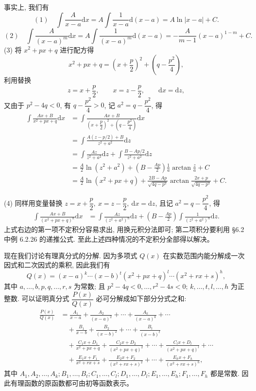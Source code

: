 \documentclass[UTF8, 12pt, fontset=fandol, oneside]{ctexart}
\begin{document}
事实上, 我们有
\[
  (1)\quad
  \int\frac A{x-a}\mathrm dx
  =
  A\int\frac1{x-a}\mathrm d(x-a)
  =
  A\ln|x-a|+C.
\]
\[
  (2)\quad
  \int\frac A{(x-a)^m}\mathrm dx
  =
  A\int\frac1{(x-a)^m}\mathrm d(x-a)
  =
  -\frac A{m-1}(x-a)^{1-m}+C.
\]
(3) 将 $x^2+px+q$ 进行配方得
\[
  x^2+px+q=\left(x+\frac p2\right)^2+\left(q-\frac{p^2}4\right),
\]
利用替换
\[
  z=x+\frac p2,\qquad x=z-\frac p2,\qquad \mathrm dx=\mathrm dz,
\]
又由于 $p^2-4q<0$, 有 $q-\dfrac{p^2}4>0$, 记 $a^2=q-\dfrac{p^2}4$, 得
\[
\begin{aligned}
  \int\frac{Ax+B}{x^2+px+q}\mathrm dx
  &=
  \int\frac{Ax+B}{\left(x+\dfrac p2\right)^2+\left(q-\dfrac{p^2}4\right)}\mathrm dx\\
  &=
  \int\frac{A(z-p/2)+B}{z^2+a^2}\mathrm dz\\
  &=
  \int\frac{Az}{z^2+a^2}\mathrm dz+
  \int\frac{B-Ap/2}{z^2+a^2}\mathrm dz\\
  &=
  \frac A2\ln(z^2+a^2)+\left(B-\frac{Ap}2\right)\frac1a\arctan\frac za+C\\
  &=
  \frac A2\ln(x^2+px+q)+
  \frac{2B-Ap}{\sqrt{4q-p^2}}\arctan\frac{2x+p}{\sqrt{4q-p^2}}+C.
\end{aligned}
\]

(4) 同样用变量替换 $z=x+\dfrac p2,\ x=z-\dfrac p2,\ \mathrm dx=\mathrm dz$, 且记 $a^2=q-\dfrac{p^2}4$, 得
\[
\begin{aligned}
  \int\frac{Ax+B}{(x^2+px+q)^n}\mathrm dx
  &=
  \int\frac{Az}{(z^2+a^2)^n}\mathrm dz+
  \left(B-\frac{Ap}2\right)\int\frac1{(z^2+a^2)^n}\mathrm dz.
\end{aligned}
\]
上式右边的第一项不定积分容易求出, 用换元积分法即可; 第二项积分要利用 \S 6.2 中例 6.2.26 的递推公式. 至此上述四种情况的不定积分全部得以解决。

现在我们讨论有理真分式的分解. 因为多项式 $Q(x)$ 在实数范围内能分解成一次因式和二次因式的乘积, 因此我们有
\[
  Q(x)=(x-a)^k\cdots(x-b)^t(x^2+px+q)^l\cdots(x^2+rx+s)^h,
\]
其中 $a,\ldots,b,p,q,\ldots,r,s$ 为常数; 且 $p^2-4q<0,\ldots,r^2-4s<0$; $k,\ldots,t,l,\ldots,h$ 为正整数. 可以证明真分式 $\dfrac{P(x)}{Q(x)}$ 必可分解成如下部分分式之和:
\[
\begin{aligned}
  \frac{P(x)}{Q(x)}
  &=
  \frac{A_1}{x-a}+\frac{A_2}{(x-a)^2}+\cdots+\frac{A_k}{(x-a)^k}+\cdots\\
  &\quad+
  \frac{B_1}{x-b}+\frac{B_2}{(x-b)^2}+\cdots+\frac{B_t}{(x-b)^t}\\
  &\quad+
  \frac{C_1x+D_1}{x^2+px+q}+\frac{C_2x+D_2}{(x^2+px+q)^2}
  +\cdots+\frac{C_lx+D_l}{(x^2+px+q)^l}+\cdots\\
  &\quad+
  \frac{E_1x+F_1}{x^2+rx+s}+\frac{E_2x+F_2}{(x^2+rx+s)^2}
  +\cdots+\frac{E_hx+F_h}{(x^2+rx+s)^h},
\end{aligned}
\]
其中 $A_1,A_2,\ldots,A_k; B_1,\ldots,B_t; C_1,\ldots,C_l; D_1,\ldots,D_l; E_1,\ldots,E_h; F_1,\ldots,F_h$ 都是常数. 因此有理函数的原函数都可由初等函数表示。
\end{document}
